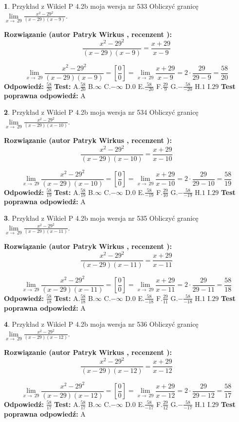 \documentclass[12pt, a4paper]{article}
\theoremstyle{definition} %
\newtheorem{zad}{}
\newcommand{\zadStart}[1]{\begin{zad}#1\newline}
\newcommand{\zadStop}{\end{zad}}
\newcommand{\rozwStart}[2]{\noindent \textbf{Rozwiązanie (autor #1 , recenzent #2): }\newline}
\newcommand{\rozwStop}{\newline}
\newcommand{\odpStart}{\noindent \textbf{Odpowiedź:}\newline}
\newcommand{\odpStop}{\newline}
\newcommand{\testStart}{\noindent \textbf{Test:}\newline}
\newcommand{\testStop}{\newline}
\newcommand{\kluczStart}{\noindent \textbf{Test poprawna odpowiedź:}\newline}
\newcommand{\kluczStop}{\newline}
\begin{document}
\zadStart{Przykład z Wikieł P 4.2b moja wersja nr 533}
Obliczyć granicę $\lim\limits_{x\to\ 29}\frac{x^{2}-29^{2}}{(x-29)(x-9)}$.
\zadStop
\rozwStart{Patryk Wirkus}{}
$$\frac{x^{2}-29^{2}}{(x-29)(x-9)}=\frac{x+29}{x-9}$$

$$\lim\limits_{x\to\ 29}\frac{x^{2}-29^{2}}{(x-29)(x-9)}=[\frac{0}{0}]=\lim\limits_{x\to\ 29}\frac{x+29}{x-9}=2 \cdot \frac{29}{29-9} = \frac{58}{20}$$
\rozwStop
\odpStart
$\frac{58}{20}$
\odpStop
\testStart
A.$\frac{58}{20}$
B.$\infty$
C.$-\infty$
D.$0$
E.$\frac{58}{-20}$
F.$\frac{29}{9}$
G.$-\frac{58}{-20}$
H.$1$
I.$29$
\testStop
\kluczStart
A
\kluczStop



\zadStart{Przykład z Wikieł P 4.2b moja wersja nr 534}
Obliczyć granicę $\lim\limits_{x\to\ 29}\frac{x^{2}-29^{2}}{(x-29)(x-10)}$.
\zadStop
\rozwStart{Patryk Wirkus}{}
$$\frac{x^{2}-29^{2}}{(x-29)(x-10)}=\frac{x+29}{x-10}$$

$$\lim\limits_{x\to\ 29}\frac{x^{2}-29^{2}}{(x-29)(x-10)}=[\frac{0}{0}]=\lim\limits_{x\to\ 29}\frac{x+29}{x-10}=2 \cdot \frac{29}{29-10} = \frac{58}{19}$$
\rozwStop
\odpStart
$\frac{58}{19}$
\odpStop
\testStart
A.$\frac{58}{19}$
B.$\infty$
C.$-\infty$
D.$0$
E.$\frac{58}{-19}$
F.$\frac{29}{10}$
G.$-\frac{58}{-19}$
H.$1$
I.$29$
\testStop
\kluczStart
A
\kluczStop



\zadStart{Przykład z Wikieł P 4.2b moja wersja nr 535}
Obliczyć granicę $\lim\limits_{x\to\ 29}\frac{x^{2}-29^{2}}{(x-29)(x-11)}$.
\zadStop
\rozwStart{Patryk Wirkus}{}
$$\frac{x^{2}-29^{2}}{(x-29)(x-11)}=\frac{x+29}{x-11}$$

$$\lim\limits_{x\to\ 29}\frac{x^{2}-29^{2}}{(x-29)(x-11)}=[\frac{0}{0}]=\lim\limits_{x\to\ 29}\frac{x+29}{x-11}=2 \cdot \frac{29}{29-11} = \frac{58}{18}$$
\rozwStop
\odpStart
$\frac{58}{18}$
\odpStop
\testStart
A.$\frac{58}{18}$
B.$\infty$
C.$-\infty$
D.$0$
E.$\frac{58}{-18}$
F.$\frac{29}{11}$
G.$-\frac{58}{-18}$
H.$1$
I.$29$
\testStop
\kluczStart
A
\kluczStop



\zadStart{Przykład z Wikieł P 4.2b moja wersja nr 536}
Obliczyć granicę $\lim\limits_{x\to\ 29}\frac{x^{2}-29^{2}}{(x-29)(x-12)}$.
\zadStop
\rozwStart{Patryk Wirkus}{}
$$\frac{x^{2}-29^{2}}{(x-29)(x-12)}=\frac{x+29}{x-12}$$

$$\lim\limits_{x\to\ 29}\frac{x^{2}-29^{2}}{(x-29)(x-12)}=[\frac{0}{0}]=\lim\limits_{x\to\ 29}\frac{x+29}{x-12}=2 \cdot \frac{29}{29-12} = \frac{58}{17}$$
\rozwStop
\odpStart
$\frac{58}{17}$
\odpStop
\testStart
A.$\frac{58}{17}$
B.$\infty$
C.$-\infty$
D.$0$
E.$\frac{58}{-17}$
F.$\frac{29}{12}$
G.$-\frac{58}{-17}$
H.$1$
I.$29$
\testStop
\kluczStart
A
\kluczStop
\end{document}
